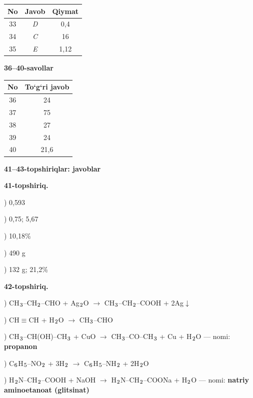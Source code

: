 \documentclass[11pt,a4paper]{article}
\renewcommand{\textsubscript}[1]{\ensuremath{_{\text{\fontsize{8}{8}\selectfont #1}}}}
\begin{document}
\noindent\begin{tabular}{|c|c|c|}\hline \textbf{No} & \textbf{Javob} & \textbf{Qiymat}\\\hline
33 & \textsl{D} & 0,4\\\hline
34 & \textsl{C} & 16\\\hline
35 & \textsl{E} & 1,12\\\hline
\end{tabular}\par\medskip
\noindent\textbf{36--40-savollar}\par\smallskip
\noindent\begin{tabular}{|c|c|}\hline \textbf{No} & \textbf{To`g`ri javob}\\\hline
36 & 24\\\hline
37 & 75\\\hline
38 & 27\\\hline
39 & 24\\\hline
40 & 21,6\\\hline
\end{tabular}\par\medskip
\noindent\textbf{41--43-topshiriqlar: javoblar}\par\smallskip
\noindent\textbf{41-topshiriq.}\par
{}) 0,593\par
{}) 0,75; 5,67\par
{}) 10,18\%\par
{}) 490 g\par
{}) 132 g; 21,2\%\par
\noindent\textbf{42-topshiriq.}\par
{}) CH\textsubscript{3}--CH\textsubscript{2}--CHO + Ag\textsubscript{2}O $\to$ CH\textsubscript{3}--CH\textsubscript{2}--COOH + 2Ag$\downarrow$\par
{}) CH$\equiv$CH + H\textsubscript{2}O $\to$ CH\textsubscript{3}--CHO\par
{}) CH\textsubscript{3}--CH(OH)--CH\textsubscript{3} + CuO $\to$ CH\textsubscript{3}--CO--CH\textsubscript{3} + Cu + H\textsubscript{2}O --- nomi: \textbf{propanon}\par
{}) C\textsubscript{6}H\textsubscript{5}--NO\textsubscript{2} + 3H\textsubscript{2} $\to$ C\textsubscript{6}H\textsubscript{5}--NH\textsubscript{2} + 2H\textsubscript{2}O\par
{}) H\textsubscript{2}N--CH\textsubscript{2}--COOH + NaOH $\to$ H\textsubscript{2}N--CH\textsubscript{2}--COONa + H\textsubscript{2}O --- nomi: \textbf{natriy aminoetanoat (glitsinat)}\par
\end{document}
